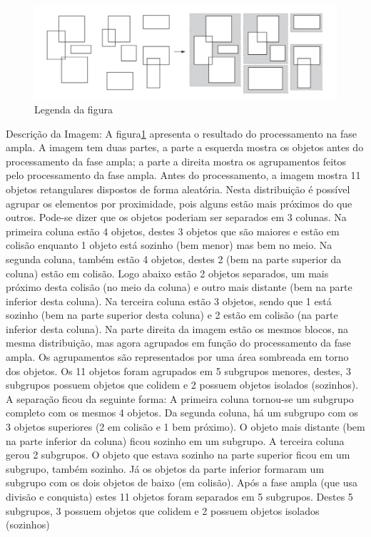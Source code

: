 \begin{figure}[htb]
  \centering
	\caption{\label{fig:figura3} Legenda da figura}
	\includegraphics[scale=0.5]{Imagens/Figura_2.4.png} %
\end{figure}

\noindent\footnotesize Descrição da Imagem: A figura\ref{fig:figura3} apresenta o resultado do processamento na fase ampla. A imagem tem duas partes, a parte a esquerda mostra os objetos antes do processamento da fase ampla; a parte a direita mostra os agrupamentos feitos pelo processamento da fase ampla.
\noindent\footnotesize Antes do processamento, a imagem mostra 11 objetos retangulares dispostos de forma aleatória. Nesta distribuição é possível agrupar os elementos por proximidade, pois alguns estão mais próximos do que outros. Pode-se dizer que os objetos poderiam ser separados em 3 colunas.
\noindent\footnotesize Na primeira coluna estão 4 objetos, destes 3 objetos que são maiores e estão em colisão enquanto 1 objeto está sozinho (bem menor) mas bem no meio. Na segunda coluna, também estão 4 objetos, destes 2 (bem na parte superior da coluna) estão em colisão. Logo abaixo estão 2 objetos separados, um mais próximo desta colisão (no meio da coluna) e outro mais distante (bem na parte inferior desta coluna). Na terceira coluna estão 3 objetos, sendo que 1 está sozinho (bem na parte superior desta coluna) e 2 estão em colisão (na parte inferior desta coluna).
\noindent\footnotesize Na parte direita da imagem estão os mesmos blocos, na mesma distribuição, mas agora agrupados em função do processamento da fase ampla. Os agrupamentos são representados por uma área sombreada em torno dos objetos. Os 11 objetos foram agrupados em 5 subgrupos menores, destes, 3 subgrupos possuem objetos que colidem e 2 possuem objetos isolados (sozinhos). A separação ficou da seguinte forma:
\noindent\footnotesize A primeira coluna tornou-se um subgrupo completo com os mesmos 4 objetos. Da segunda coluna, há um subgrupo com os 3 objetos superiores (2 em colisão e 1 bem próximo). O objeto mais distante (bem na parte inferior da coluna) ficou sozinho em um subgrupo.
\noindent\footnotesize A terceira coluna gerou 2 subgrupos. O objeto que estava sozinho na parte superior ficou em um subgrupo, também sozinho. Já os objetos da parte inferior formaram um subgrupo com os dois objetos de baixo (em colisão).
\noindent\footnotesize Após a fase ampla (que usa divisão e conquista) estes 11 objetos foram separados em 5 subgrupos. Destes 5 subgrupos, 3 possuem objetos que colidem e 2 possuem objetos isolados (sozinhos)

